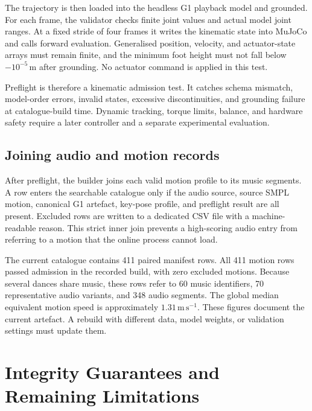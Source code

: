 The trajectory is then loaded into the headless G1 playback model and grounded.
For each frame, the validator checks finite joint values and actual model joint
ranges. At a fixed stride of four frames it writes the kinematic state into
MuJoCo and calls forward evaluation. Generalised position, velocity, and
actuator-state arrays must remain finite, and the minimum foot height must not
fall below $-10^{-5}\,\mathrm{m}$ after grounding. No actuator command is
applied in this test.

Preflight is therefore a kinematic admission test. It catches schema mismatch, model-order
errors, invalid states, excessive discontinuities, and grounding failure at
catalogue-build time. Dynamic tracking, torque limits, balance, and hardware
safety require a later controller and a separate experimental evaluation.

\subsection{Joining audio and motion records}
\label{subsec:catalogue_join}

After preflight, the builder joins each valid motion profile to its music
segments. A row enters the searchable catalogue only if the audio source,
source SMPL motion, canonical G1 artefact, key-pose profile, and preflight result
are all present. Excluded rows are written to a dedicated CSV file with a
machine-readable reason. This strict inner join prevents a high-scoring audio
entry from referring to a motion that the online process cannot load.

The current catalogue contains 411 paired manifest
rows. All 411 motion rows passed admission in the recorded build, with zero
excluded motions. Because several dances share music, these rows refer to 60
music identifiers, 70 representative audio variants, and 348 audio segments.
The global median equivalent motion speed is approximately
$1.31\,\mathrm{m\,s^{-1}}$. These figures document the current artefact. A rebuild with different data, model
weights, or validation settings must update them.

\section{Integrity Guarantees and Remaining Limitations}
\label{sec:offline_integrity}


